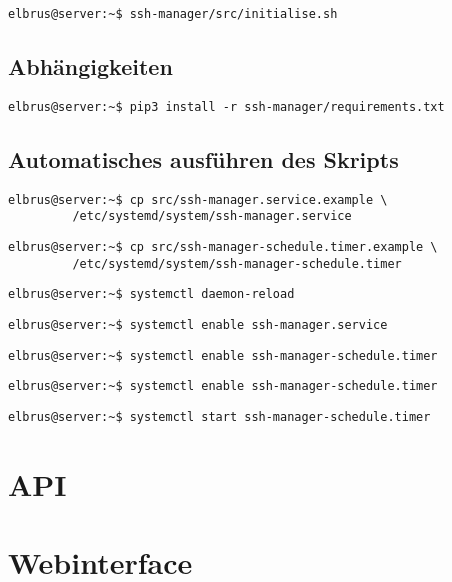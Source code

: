 \documentclass{article}
\begin{document}
	\lstset{style=commands}	
	\begin{lstlisting}[caption={Ausführen des Scripts zur Initialisierung des VCS Verzeichnisses.}]
		elbrus@server:~$ ssh-manager/src/initialise.sh
	\end{lstlisting}

	\subsection[init commands]{Abhängigkeiten}
	\begin{lstlisting}[caption={Installieren von fehlenden python3 Packages.}]
		elbrus@server:~$ pip3 install -r ssh-manager/requirements.txt
	\end{lstlisting}

	\newpage
	\subsection[systemd service]{Automatisches ausführen des Skripts}
	\begin{lstlisting}[caption={Kopieren des Serviceprogrammes}]
		elbrus@server:~$ cp src/ssh-manager.service.example \
		 /etc/systemd/system/ssh-manager.service
	\end{lstlisting}

	\begin{lstlisting}[caption={Kopieren des Zeitplanungsprogrammes.}]
		elbrus@server:~$ cp src/ssh-manager-schedule.timer.example \
		 /etc/systemd/system/ssh-manager-schedule.timer
	\end{lstlisting}

	\begin{lstlisting}[caption={Neuladen des 'systemctl' Deamons}]
		elbrus@server:~$ systemctl daemon-reload
	\end{lstlisting}

	\begin{lstlisting}[caption={Aktivieren des Serviceprogrammes}]
		elbrus@server:~$ systemctl enable ssh-manager.service
	\end{lstlisting}

	\begin{lstlisting}[caption={Aktivieren des Zeitplanungsprogrammes}]
		elbrus@server:~$ systemctl enable ssh-manager-schedule.timer
	\end{lstlisting}

	\begin{lstlisting}[caption={Aktivieren des Zeitplanungsprogrammes}]
		elbrus@server:~$ systemctl enable ssh-manager-schedule.timer
	\end{lstlisting}

	\begin{lstlisting}[caption={Starten des Zeitplanungsprogrammes}]
		elbrus@server:~$ systemctl start ssh-manager-schedule.timer
	\end{lstlisting}
	\newpage
	
	\section{API}
	\newpage
	
	\section{Webinterface}
	\newpage
\end{document}
